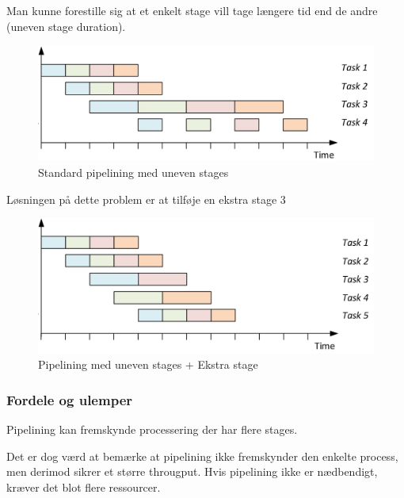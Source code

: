 Man kunne forestille sig at et enkelt stage vill tage længere tid end de andre (uneven stage duration).

\begin{figure}[H]
	\centering
	\includegraphics[width=0.7\linewidth]{figs/pipeFut/unevenStage}
	\caption{Standard pipelining med uneven stages}
	\label{fig:Unevenpipelining}
\end{figure}

Løsningen på dette problem er at tilføje en ekstra stage 3

\begin{figure}[H]
	\centering
	\includegraphics[width=0.7\linewidth]{figs/pipeFut/ekstraFilter}
	\caption{Pipelining med uneven stages + Ekstra stage}
	\label{fig:UnevenpipeliningWStage}
\end{figure}

\subsubsection{Fordele og ulemper}

Pipelining kan fremskynde processering der har flere stages.

Det er dog værd at bemærke  at pipelining ikke fremskynder den enkelte process, men derimod sikrer et større througput. Hvis pipelining ikke er nædbendigt, kræver det blot flere ressourcer.
